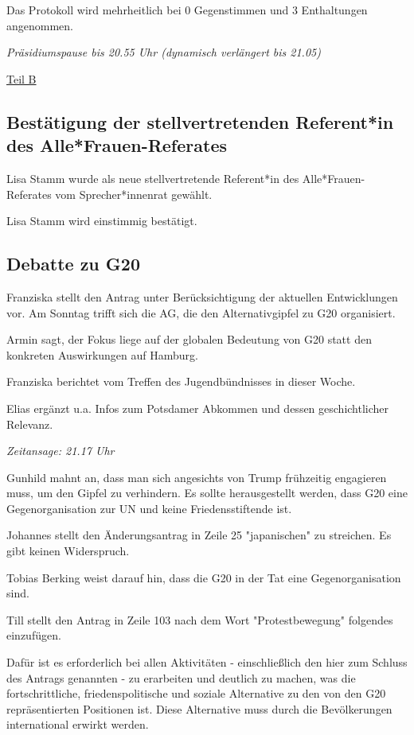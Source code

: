\documentclass[ngerman,headheight=70pt]{scrartcl}
\begin{document}
    Das Protokoll wird mehrheitlich bei 0 Gegenstimmen und 3 Enthaltungen
    angenommen.

    \textit{Präsidiumspause bis 20.55 Uhr (dynamisch verlängert bis 21.05)}

    \vspace{0.5cm}
    {\Large \underline{Teil B}}

    \subsection{Bestätigung der stellvertretenden Referent*in des Alle*Frauen-Referates}

    Lisa Stamm wurde als neue stellvertretende Referent*in des Alle*Frauen-Referates
    vom Sprecher*innenrat gewählt.

    Lisa Stamm wird einstimmig bestätigt.

    \subsection{Debatte zu G20}

    Franziska stellt den Antrag unter Berücksichtigung der aktuellen Entwicklungen
    vor. Am Sonntag trifft sich die AG, die den Alternativgipfel zu G20 organisiert.

    Armin sagt, der Fokus liege auf der globalen Bedeutung von G20 statt den konkreten
    Auswirkungen auf Hamburg.

    Franziska berichtet vom Treffen des Jugendbündnisses in dieser Woche.

    Elias ergänzt u.a. Infos zum Potsdamer Abkommen und dessen geschichtlicher
    Relevanz.

    \textit{Zeitansage: 21.17 Uhr}

    Gunhild mahnt an, dass man sich angesichts von Trump frühzeitig engagieren
    muss, um den Gipfel zu verhindern. Es sollte herausgestellt werden, dass
    G20 eine Gegenorganisation zur UN und keine Friedensstiftende ist.

    Johannes stellt den Änderungsantrag in Zeile 25 "japanischen" zu streichen.
    Es gibt keinen Widerspruch.

    Tobias Berking weist darauf hin, dass die G20 in der Tat eine Gegenorganisation
    sind.

    Till stellt den Antrag in Zeile 103 nach dem Wort "Protestbewegung" folgendes
    einzufügen.

    \begin{blockquote}
        Dafür ist es erforderlich bei allen Aktivitäten - einschließlich den hier
        zum Schluss des Antrags genannten - zu erarbeiten und deutlich zu machen,
        was die fortschrittliche, friedenspolitische und soziale Alternative zu
        den von den G20 repräsentierten Positionen ist. Diese Alternative muss
        durch die Bevölkerungen international erwirkt werden.
    \end{blockquote}
\end{document}
